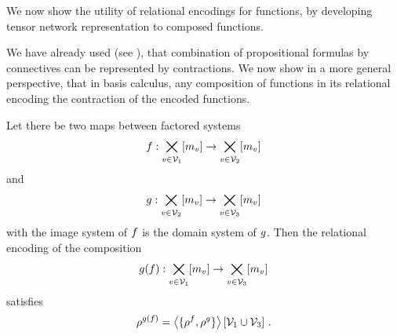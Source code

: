 
We now show the utility of relational encodings for functions, by developing tensor network representation to composed functions.


We have already used (see ), that combination of propositional formulas by connectives can be represented by contractions.
We now show in a more general perspective, that in basis calculus, any composition of functions in its relational encoding the contraction of the encoded functions.

\begin{theorem}\label{the:compositionByContraction}
	Let there be two maps between factored systems 
		\[ f : \bigtimes_{v\in\mathcal{V}_1} [m_{v}] \rightarrow \bigtimes_{v\in\mathcal{V}_2} [m_{v}] \]
	and 
		\[ g : \bigtimes_{v\in\mathcal{V}_2} [m_{v}] \rightarrow \bigtimes_{v\in\mathcal{V}_3} [m_{v}] \]
	with the image system of $f$ is the domain system of $g$.
	Then the relational encoding of the composition 
		\[ g(f) :  \bigtimes_{v\in\mathcal{V}_1} [m_{v}] \rightarrow \bigtimes_{v\in\mathcal{V}_3} [m_{v}] \]
	satisfies
		\[ \rho^{g(f)} = \left\langle \{\rho^{f},\rho^{g}\}\right\rangle \left[ \mathcal{V}_1\cup\mathcal{V}_3 \right] \, .  \]
\end{theorem}
